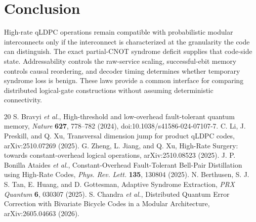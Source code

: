 \documentclass[aps,prx,reprint,superscriptaddress,nofootinbib,longbibliography,floatfix]{revtex4-2}
\begin{document}
\section{Conclusion}
High-rate qLDPC operations remain compatible with probabilistic modular interconnects only if the interconnect is characterized at the granularity the code can distinguish. The exact partial-CNOT syndrome deficit supplies that code-side state. Addressability controls the raw-service scaling, successful-ebit memory controls causal reordering, and decoder timing determines whether temporary syndrome loss is benign. These laws provide a common interface for comparing distributed logical-gate constructions without assuming deterministic connectivity.

\begin{thebibliography}{20}
 S. Bravyi \emph{et al.}, High-threshold and low-overhead fault-tolerant quantum memory, \emph{Nature} \textbf{627}, 778--782 (2024), doi:10.1038/s41586-024-07107-7.
 C. Li, J. Preskill, and Q. Xu, Transversal dimension jump for product qLDPC codes, arXiv:2510.07269 (2025).
 G. Zheng, L. Jiang, and Q. Xu, High-Rate Surgery: towards constant-overhead logical operations, arXiv:2510.08523 (2025).
 J. P. Bonilla Ataides \emph{et al.}, Constant-Overhead Fault-Tolerant Bell-Pair Distillation using High-Rate Codes, \emph{Phys. Rev. Lett.} \textbf{135}, 130804 (2025).
 N. Berthusen, S. J. S. Tan, E. Huang, and D. Gottesman, Adaptive Syndrome Extraction, \emph{PRX Quantum} \textbf{6}, 030307 (2025).
 S. Chandra \emph{et al.}, Distributed Quantum Error Correction with Bivariate Bicycle Codes in a Modular Architecture, arXiv:2605.04663 (2026).
\end{thebibliography}
\end{document}
